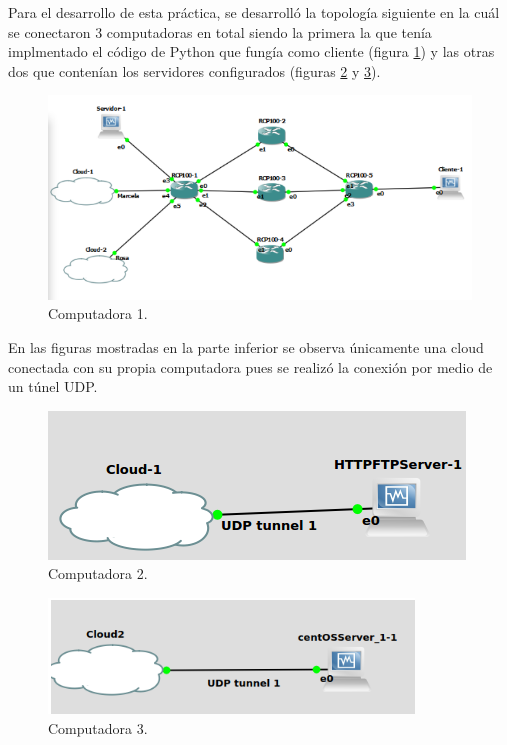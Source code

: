 Para el desarrollo de esta práctica, se desarrolló la topología siguiente en la cuál se conectaron 3 computadoras en total siendo la primera la que tenía implmentado el código de Python que fungía como cliente (figura \ref{image:top1}) y las otras dos que contenían los servidores configurados (figuras \ref{image:top2} y \ref{image:top3}).

\FloatBarrier
\begin{figure}[htbp!]
		\centering
			\includegraphics[width=.8 \textwidth]{images/top1}
		\caption{Computadora 1.}
		\label{image:top1}
\end{figure}
\FloatBarrier

En las figuras mostradas en la parte inferior se observa únicamente una cloud conectada con su propia computadora pues se realizó la conexión por medio de un túnel UDP.
\FloatBarrier
\begin{figure}[htbp!]
		\centering
			\includegraphics[width=.5 \textwidth]{images/top2}
		\caption{Computadora 2.}
		\label{image:top2}
\end{figure}
\FloatBarrier

\FloatBarrier
\begin{figure}[htbp!]
		\centering
			\includegraphics[width=.55 \textwidth]{images/top3}
		\caption{Computadora 3.}
		\label{image:top3}
\end{figure}
\FloatBarrier

